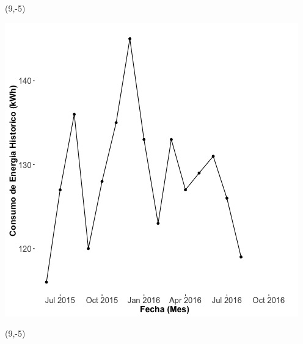 \documentclass{article}\usepackage[]{graphicx}\usepackage[]{color}
\newenvironment{knitrout}{}{} %
\begin{document}
 \begin{textblock}{1}(9,-5)
\begin{minipage}{20em}
\begingroup

\endgroup
\end{minipage}
\end{textblock}

\begin{knitrout}
\color{fgcolor}
\includegraphics[scale=0.65]{figure/A14_historico_energia} 
\end{knitrout}

 \begin{textblock}{1}(9,-5)
\begin{minipage}{20em}
\begingroup

\endgroup
\end{minipage}
\end{textblock}
\end{document}
